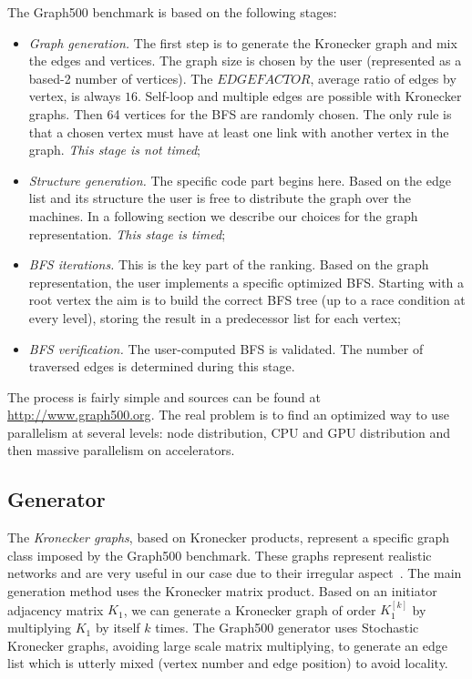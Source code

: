 The Graph500 benchmark is based on the following stages:
\begin{itemize}
	\item \textit{Graph generation.} The first step is to generate the Kronecker graph and mix the edges and vertices. 
	The graph size is chosen by the user (represented as a based-2 number of vertices). The $EDGEFACTOR$, average ratio of edges by vertex, is always $16$. 
	Self-loop and multiple edges are possible with Kronecker graphs.
	Then 64 vertices for the BFS are randomly chosen. 
	The only rule is that a chosen vertex must have at least one link with another vertex in the graph. \textit{This stage is not timed};
	\item \textit{Structure generation.} The specific code part begins here. 
	Based on the edge list and its structure the user is free to distribute the graph over the machines. 
	In a following section we describe our choices for the graph representation. \textit{This stage is timed};
	\item \textit{BFS iterations.} This is the key part of the ranking. Based on the graph representation, the user implements a specific optimized BFS. Starting with a root vertex the aim is to build the correct BFS tree (up to a race condition at every level), storing the result in a predecessor list for each vertex;
	\item \textit{BFS verification.} The user-computed BFS is validated. The number of traversed edges is determined during this stage.  
\end{itemize}

The process is fairly simple and sources can be found at \url{http://www.graph500.org}.
The real problem is to find an optimized way to use parallelism at several levels: node distribution, CPU and GPU distribution and then massive parallelism on accelerators.



\subsection{Generator}

The \textit{Kronecker graphs}, based on Kronecker products, represent a specific graph class
imposed by the Graph500 benchmark. 
These graphs represent realistic networks and are very useful in our case due to their irregular aspect~\cite{leskovec2010kronecker}. 
The main generation method uses the Kronecker matrix product. 
Based on an initiator adjacency matrix $K_1$, we can generate a Kronecker graph of order $K_1^{[k]}$ by multiplying $K_1$ by itself $k$ times. 
The Graph500 generator uses Stochastic Kronecker graphs, avoiding large scale matrix multiplying, to generate an edge list which is utterly mixed (vertex number and edge position) to avoid locality. 

